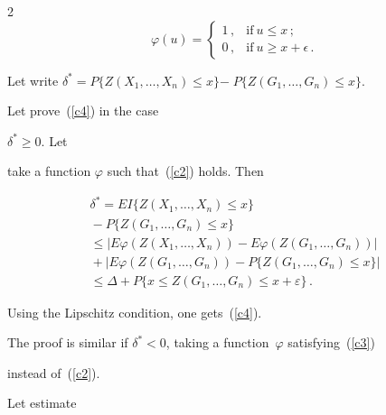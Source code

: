 \begin{multicols}{2}
\begin{equation}
    \varphi(u)=

    \begin{cases}

    1\,, &\mbox{if}\ u\leq x\,; \\[6pt]

    0\,, &\mbox{if}\ u\geq x+\epsilon\,. 

    \end{cases}

    \end{equation}

Let write $\delta^{*} =P\{Z(X_1,\ldots,X_n) \leq x\}$\linebreak $ -\;P\{Z(G_1,\ldots,G_n) \leq x\}$.

    Let prove~(\ref{c4}) in the case

    $\delta^{*} \geq 0.$  Let 

    take a function $\varphi$ such that~(\ref{c2}) holds. Then

    

    \noindent

    \begin{multline*}

\delta^{*}  = EI\{Z(X_1,\ldots,X_n)\leq x\}\\

{}-P\{Z(G_1,\ldots,G_n)\leq x\} \\

 \leq 

    |E\varphi(Z(X_1,\ldots,X_n))-E\varphi(Z(G_1,\ldots,G_n))|\\

    {}+|E\varphi(Z(G_1,\ldots,G_n))-

    P\{Z(G_1,\ldots,G_n)\leq

    x\}|  \\

     \leq 

    \Delta+P\{x\leq Z(G_1,\ldots,G_n)\leq x+\varepsilon\}\,. 

    \end{multline*}

    Using the Lipschitz condition, one gets~(\ref{c4}).



    The proof is similar if $\delta^{*} <0$, taking a function~$\varphi$ satisfying~(\ref{c3})

    instead of~(\ref{c2}).



    Let estimate

    


\end{multicols}
